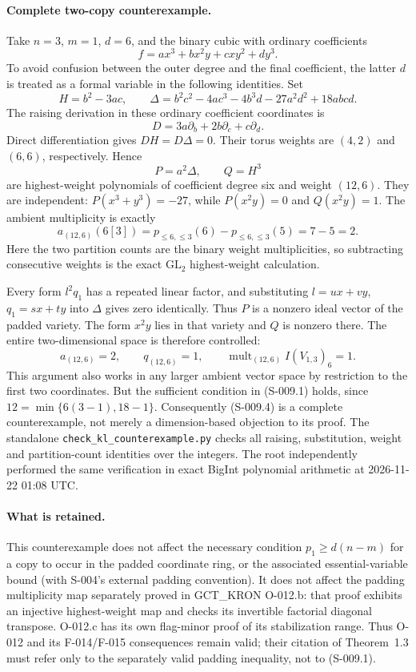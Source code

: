 \paragraph{Complete two-copy counterexample.}
Take $n=3$, $m=1$, $d=6$, and the binary cubic with ordinary
coefficients
\[
                       f=ax^3+bx^2y+cxy^2+dy^3.
\]
To avoid confusion between the outer degree and the final coefficient,
the latter $d$ is treated as a formal variable in the following
identities.  Set
\[
 H=b^2-3ac,\qquad
 \Delta=b^2c^2-4ac^3-4b^3d-27a^2d^2+18abcd.
\]
The raising derivation in these ordinary coefficient coordinates is
\[
                         D=3a\partial_b+2b\partial_c+c\partial_d.
\]
Direct differentiation gives $DH=D\Delta=0$.  Their torus weights
are $(4,2)$ and $(6,6)$, respectively.  Hence
\[
                              P=a^2\Delta,\qquad Q=H^3        \tag{S-009.2}
\]
are highest-weight polynomials of coefficient degree six and weight
$(12,6)$.  They are independent: $P(x^3+y^3)=-27$, while
$P(x^2y)=0$ and $Q(x^2y)=1$.
The ambient multiplicity is exactly
\[
 a_{(12,6)}(6[3])=p_{\leq6,\leq3}(6)-p_{\leq6,\leq3}(5)
                         =7-5=2.                             \tag{S-009.3}
\]
Here the two partition counts are the binary weight multiplicities,
so subtracting consecutive weights is the exact $\mathrm{GL}_2$
highest-weight calculation.

Every form $l^2q_1$ has a repeated linear factor, and substituting
$l=ux+vy$, $q_1=sx+ty$ into $\Delta$ gives zero identically.
Thus $P$ is a nonzero ideal vector of the padded variety.  The
form $x^2y$ lies in that variety and $Q$ is nonzero there.  The
entire two-dimensional space is therefore controlled:
\[
                a_{(12,6)}=2,\qquad q_{(12,6)}=1,\qquad
                \operatorname{mult}_{(12,6)}I(V_{1,3})_6=1.   \tag{S-009.4}
\]
This argument also works in any larger ambient vector space by
restriction to the first two coordinates.  But the sufficient
condition in (S-009.1) holds, since
$12=\min\{6(3-1),18-1\}$.  Consequently (S-009.4) is a complete
counterexample, not merely a dimension-based objection to its proof.
The standalone \texttt{check\_kl\_counterexample.py} checks all
raising, substitution, weight and partition-count identities over
the integers.  The root independently performed the same verification
in exact BigInt polynomial arithmetic at 2026-11-22 01:08 UTC.

\paragraph{What is retained.}
This counterexample does not affect the necessary condition
$p_1\geq d(n-m)$ for a copy to occur in the padded coordinate ring,
or the associated essential-variable bound (with S-004's external
padding convention).  It does not affect the padding multiplicity
map separately proved in GCT\_KRON O-012.b: that proof exhibits an
injective highest-weight map and checks its invertible factorial
diagonal transpose.  O-012.c has its own flag-minor proof of its
stabilization range.  Thus O-012 and its F-014/F-015 consequences
remain valid; their citation of Theorem~1.3 must refer only to the
separately valid padding inequality, not to (S-009.1).


